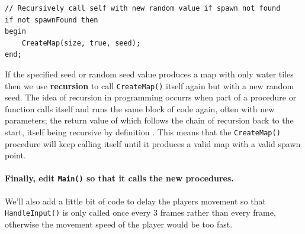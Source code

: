 \documentclass{article}
\begin{document}
\begin{verbatim}
// Recursively call self with new random value if spawn not found
if not spawnFound then
begin
	CreateMap(size, true, seed);
end;
\end{verbatim}

If the specified seed or random seed value produces a map with only water tiles then we use \textbf{recursion} to call \texttt{CreateMap()} itself again but with a new random seed. The idea of recursion in programming occurrs when part of a procedure or function calls itself and runs the same block of code again, often with new parameters; the return value of which follows the chain of recursion back to the start, itself being recursive by definition \parencite{recursion}. This means that the \texttt{CreateMap()} procedure will keep calling itself until it produces a valid map with a valid spawn point.

\paragraph{Finally, edit \texttt{Main()} so that it calls the new procedures.} We'll also add a little bit of code to delay the players movement so that \texttt{HandleInput()} is only called once every 3 frames rather than every frame, otherwise the movement speed of the player would be too fast.

\printbibliography
	
\end{document}
